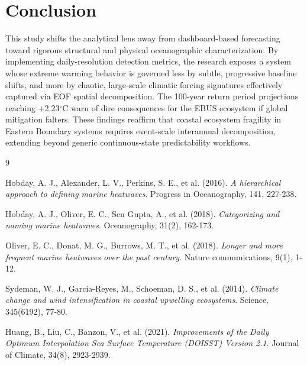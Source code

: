 \documentclass[11pt,a4paper]{article}
\begin{document}
\section{Conclusion}
This study shifts the analytical lens away from dashboard-based forecasting toward rigorous structural and physical oceanographic characterization. By implementing daily-resolution detection metrics, the research exposes a system whose extreme warming behavior is governed less by subtle, progressive baseline shifts, and more by chaotic, large-scale climatic forcing signatures effectively captured via EOF spatial decomposition. The 100-year return period projections reaching +2.23$^\circ$C warn of dire consequences for the EBUS ecosystem if global mitigation falters. These findings reaffirm that coastal ecosystem fragility in Eastern Boundary systems requires event-scale interannual decomposition, extending beyond generic continuous-state predictability workflows. 

\begin{thebibliography}{9}

Hobday, A. J., Alexander, L. V., Perkins, S. E., et al. (2016).
\textit{A hierarchical approach to defining marine heatwaves}.
Progress in Oceanography, 141, 227-238.

Hobday, A. J., Oliver, E. C., Sen Gupta, A., et al. (2018).
\textit{Categorizing and naming marine heatwaves}.
Oceanography, 31(2), 162-173.

Oliver, E. C., Donat, M. G., Burrows, M. T., et al. (2018).
\textit{Longer and more frequent marine heatwaves over the past century}.
Nature communications, 9(1), 1-12.

Sydeman, W. J., Garcia-Reyes, M., Schoeman, D. S., et al. (2014).
\textit{Climate change and wind intensification in coastal upwelling ecosystems}.
Science, 345(6192), 77-80.

Huang, B., Liu, C., Banzon, V., et al. (2021).
\textit{Improvements of the Daily Optimum Interpolation Sea Surface Temperature (DOISST) Version 2.1}.
Journal of Climate, 34(8), 2923-2939.

\end{thebibliography}
\end{document}
